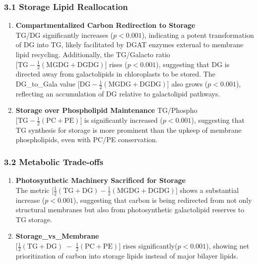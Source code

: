 \documentclass[10pt,letterpaper]{article}
\begin{document}
\subsubsection*{3.1 Storage Lipid Reallocation}
\begin{enumerate}
  \item \textbf{Compartmentalized Carbon Redirection to Storage} \\
  TG/DG significantly increases (\(p<0.001\)), indicating a potent transformation of DG into TG, likely facilitated by DGAT enzymes external to membrane lipid recycling. Additionally, the TG/Galacto ratio \(\bigl[\mathrm{TG} - \tfrac{1}{2}(\mathrm{MGDG}+\mathrm{DGDG})\bigr]\) rises (\(p<0.001\)), suggesting that DG is directed away from galactolipids in chloroplasts to be stored. The DG\_to\_Gala value \(\bigl[\mathrm{DG} - \tfrac{1}{2}(\mathrm{MGDG}+\mathrm{DGDG})\bigr]\) also grows (\(p<0.001\)), reflecting an accumulation of DG relative to galactolipid pathways.

  \item \textbf{Storage over Phospholipid Maintenance}
  TG/Phospho \(\bigl[\mathrm{TG} - \tfrac{1}{2}(\mathrm{PC}+\mathrm{PE})\bigr]\) is significantly increased (\(p<0.001\)), suggesting that TG synthesis for storage is more prominent than the upkeep of membrane phospholipids, even with PC/PE conservation.
  
\end{enumerate}


\subsubsection*{3.2 Metabolic Trade-offs}
\begin{enumerate}
  \item \textbf{Photosynthetic Machinery Sacrificed for Storage} \\
  The metric \(\bigl[\tfrac{1}{2}(\mathrm{TG} + \mathrm{DG}) - \tfrac{1}{2}(\mathrm{MGDG} + \mathrm{DGDG})\bigr]\) shows a substantial increase (\(p<0.001\)), suggesting that carbon is being redirected from not only structural membranes but also from photosynthetic galactolipid reserves to TG storage.
  
  \item \textbf{Storage\_vs\_Membrane} \\
    \(\bigl[\tfrac{1}{2}(\mathrm{TG} + \mathrm{DG}) \;-\; \tfrac{1}{2}(\mathrm{PC} + \mathrm{PE})\bigr]\) rises significantly(\(p<0.001\)), showing net prioritization of carbon into storage lipids instead of major bilayer lipids.
  
\end{enumerate}
\end{document}
